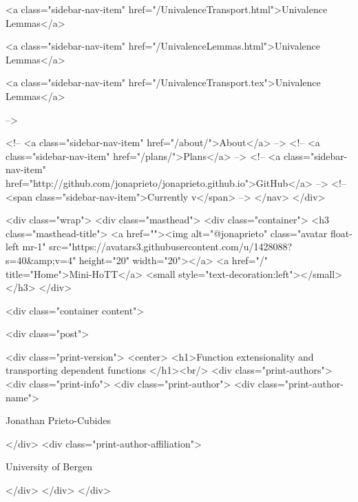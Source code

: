       
    
      
        
          <a class="sidebar-nav-item" href="/UnivalenceTransport.html">Univalence Lemmas</a>
        
      
    
      
        
          <a class="sidebar-nav-item" href="/UnivalenceLemmas.html">Univalence Lemmas</a>
        
      
    
      
        
          <a class="sidebar-nav-item" href="/UnivalenceTransport.tex">Univalence Lemmas</a>
        
      
     -->

    <!-- <a class="sidebar-nav-item" href="/about/">About</a> -->
    <!-- <a class="sidebar-nav-item" href="/plans/">Plans</a> -->
    <!-- <a class="sidebar-nav-item" href="http://github.com/jonaprieto/jonaprieto.github.io">GitHub</a> -->
    <!-- <span class="sidebar-nav-item">Currently v</span> -->
  </nav>
</div>

    <div class="wrap">
      <div class="masthead">
        <div class="container">
          <h3 class="masthead-title">
            <a href=""><img alt="@jonaprieto" class="avatar float-left mr-1" src="https://avatars3.githubusercontent.com/u/1428088?s=40&amp;v=4" height="20" width="20"></a>
            <a href="/" title="Home">Mini-HoTT</a>
            <small style="text-decoration:left"></small>
          </h3>
        </div>
      
      <div class="container content">
        







<div class="post">

  <div class="print-version">
    <center>
      <h1>Function extensionality and transporting dependent functions </h1><br/>
        <div class="print-authors">
          <div class="print-info">
            <div class="print-author">
              <div class="print-author-name">
                
                  Jonathan Prieto-Cubides
                
              </div>
              <div class="print-author-affiliation">
                
                  University of Bergen
                
                </div>
            </div>
          </div>
          
